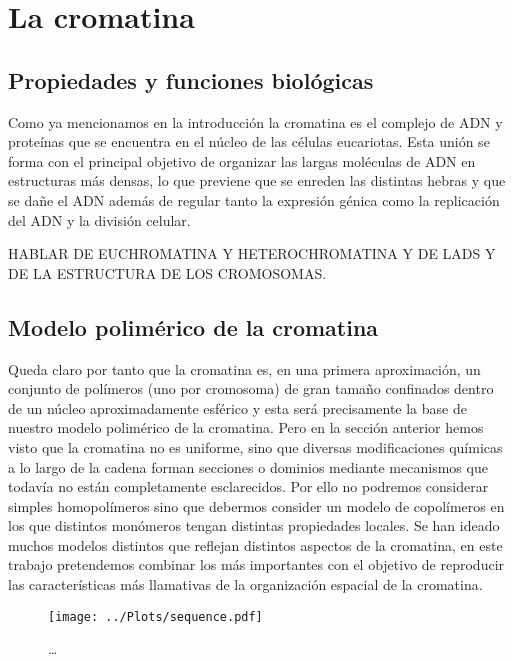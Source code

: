 \chapter{La cromatina}
\label{cap:chromatin}

\section{Propiedades y funciones biológicas}

Como ya mencionamos en la introducción la cromatina es el complejo de ADN y proteínas que se encuentra en el núcleo de las células eucariotas. Esta unión se forma con el principal objetivo de organizar las largas moléculas de ADN en estructuras más densas, lo que previene que se enreden las distintas hebras y que se dañe el ADN además de regular tanto la expresión génica como la replicación del ADN y la división celular.

HABLAR DE EUCHROMATINA Y HETEROCHROMATINA Y DE LADS Y DE LA ESTRUCTURA DE LOS CROMOSOMAS.

\section{Modelo polimérico de la cromatina}

Queda claro por tanto que la cromatina es, en una primera aproximación, un conjunto de polímeros (uno por cromosoma) de gran tamaño confinados dentro de un núcleo aproximadamente esférico y esta será precisamente la base de nuestro modelo polimérico de la cromatina. Pero en la sección anterior hemos visto que la cromatina no es uniforme, sino que diversas modificaciones químicas a lo largo de la cadena forman secciones o dominios mediante mecanismos que todavía no están completamente esclarecidos. Por ello no podremos considerar simples homopolímeros sino que debermos consider un modelo de copolímeros en los que distintos monómeros tengan distintas propiedades locales. Se han ideado muchos modelos distintos que reflejan distintos aspectos de la cromatina, en este trabajo pretendemos combinar los más importantes con el objetivo de reproducir las características más llamativas de la organización espacial de la cromatina.

\begin{figure}
    \centering
    \texttt{[image: ../Plots/sequence.pdf]}
    \caption{\dots}
    \label{fig:sequence}
\end{figure}
